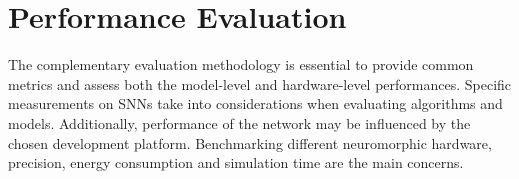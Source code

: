 \section{Performance Evaluation}
\label{sec:eval}
The complementary evaluation methodology is essential to provide common metrics and assess both the model-level and hardware-level performances.
Specific measurements on SNNs take into considerations when evaluating algorithms and models.
Additionally, performance of the network may be influenced by the chosen development platform.
Benchmarking different neuromorphic hardware, precision, energy consumption and simulation time are the main concerns.



